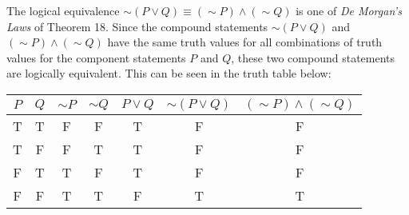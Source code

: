 \documentclass[12pt]{article}
\newenvironment{problem}[2][Problem]{\begin{trivlist}
		\item[\hskip \labelsep {\bfseries #1}\hskip \labelsep {\bfseries #2.}]}{\end{trivlist}}
\newenvironment{solution}[2][Solution]{\begin{trivlist}
		\item[\hskip \labelsep {\bfseries #1}\hskip \labelsep {\bfseries #2.}]}{\end{trivlist}}
\begin{document}
\begin{problem}{58}
\begin{equation*}
	\end{equation*}
	\begin{solution}{b}
		The logical equivalence $\sim (P\vee Q) \equiv (\sim P)\wedge (\sim Q)$ is one of \textit{De Morgan's Laws} of Theorem 18. Since the compound statements $\sim (P\vee Q)$ and $(\sim P)\wedge (\sim Q)$ have the same truth values for all combinations of truth values for the component statements $P$ and $Q$, these two compound statements are logically equivalent. This can be seen in the truth table below:
		\begin{center}
			\begin{tabular}{c c c c c c c}
				$P$ & $Q$ & $\sim P$ & $\sim Q$ & $P\vee Q$ & $\sim(P \vee Q)$ & $(\sim P) \wedge (\sim Q)$\\
				\hline
				T & T & F & F & T & F & F\\
				T & F & F & T & T & F & F\\
				F & T & T & F & T & F & F\\
				F & F & T & T & F & T & T\\
				\hline
			\end{tabular}
		\end{center}
	\end{solution}
\end{problem}
\end{document}
